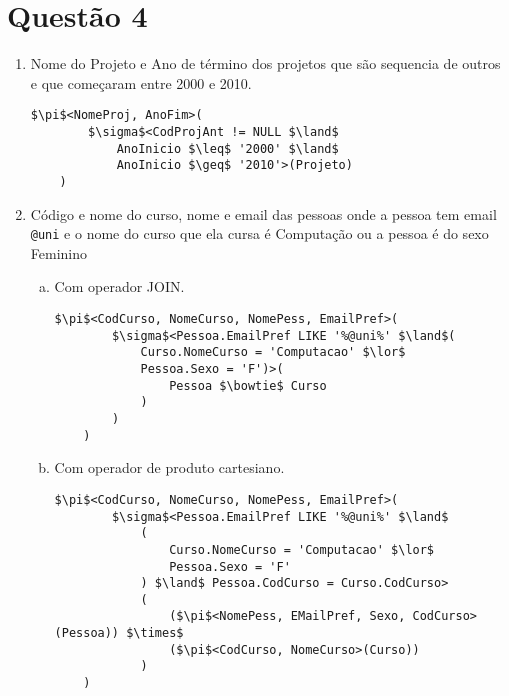 \documentclass[fleqn]{article}
\begin{document}
\section*{Questão 4}
    \begin{enumerate}[I] %
        \item Nome do Projeto e Ano de término dos projetos que são
        sequencia de outros e que começaram entre 2000 e 2010.
            \begin{lstlisting}[mathescape]
    $\pi$<NomeProj, AnoFim>(
        $\sigma$<CodProjAnt != NULL $\land$
            AnoInicio $\leq$ '2000' $\land$
            AnoInicio $\geq$ '2010'>(Projeto)
    )
            \end{lstlisting}
        
        \item Código e nome do curso, nome e email das pessoas onde a pessoa tem
        email \texttt{@uni} e o nome do curso que ela cursa é Computação ou a
        pessoa é do sexo Feminino
        \begin{enumerate}[(a)] %
            \item Com operador JOIN.
                \begin{lstlisting}[mathescape]
    $\pi$<CodCurso, NomeCurso, NomePess, EmailPref>(
        $\sigma$<Pessoa.EmailPref LIKE '%@uni%' $\land$(
            Curso.NomeCurso = 'Computacao' $\lor$
            Pessoa.Sexo = 'F')>(
                Pessoa $\bowtie$ Curso
            )
        )
    )
                \end{lstlisting}

            \item Com operador de produto cartesiano.
                \begin{lstlisting}[mathescape]
    $\pi$<CodCurso, NomeCurso, NomePess, EmailPref>(
        $\sigma$<Pessoa.EmailPref LIKE '%@uni%' $\land$
            (
                Curso.NomeCurso = 'Computacao' $\lor$
                Pessoa.Sexo = 'F'
            ) $\land$ Pessoa.CodCurso = Curso.CodCurso>
            (
                ($\pi$<NomePess, EMailPref, Sexo, CodCurso>(Pessoa)) $\times$
                ($\pi$<CodCurso, NomeCurso>(Curso))
            )
    )
                \end{lstlisting}
        \end{enumerate}
        

\end{enumerate}
\end{document}

